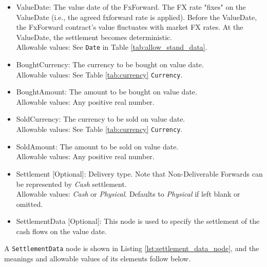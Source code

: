 \begin{itemize}
\item ValueDate: The value date of the FxForward. The FX rate "fixes" on the ValueDate (i.e., the agreed fxforward rate is applied). Before the ValueDate, the FxForward contract's value fluctuates with market FX rates.
At the ValueDate, the settlement becomes deterministic. \\ Allowable values:  See \lstinline!Date! in Table \ref{tab:allow_stand_data}.
\item BoughtCurrency: The currency to be bought on value date.  \\ Allowable values:  See Table \ref{tab:currency}  \lstinline!Currency!.
\item BoughtAmount: The amount to be bought on value date.  \\ Allowable values:  Any positive real number.
\item SoldCurrency: The currency to be sold on value date.  \\ Allowable values:   See Table \ref{tab:currency}  \lstinline!Currency!.
\item SoldAmount: The amount to be sold on value date.  \\ Allowable values:  Any positive real number.
\item Settlement [Optional]: Delivery type.  Note that Non-Deliverable Forwards can be represented by \emph{Cash} settlement. \\
Allowable values: \emph{Cash} or \emph{Physical}.  Defaults to \emph{Physical} if left blank or omitted.
\item SettlementData [Optional]: This node is used to specify  the settlement of the cash flows on the value date.
\end{itemize}

A \lstinline!SettlementData! node is shown in Listing \ref{lst:settlement_data_node}, and the meanings and allowable values of its elements follow below.

